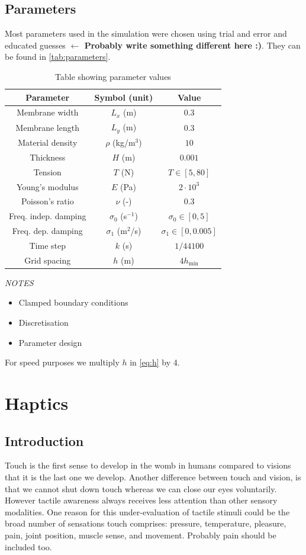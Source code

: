 \documentclass{vgtc}
\begin{document}
\subsection{Parameters}
Most parameters used in the simulation were chosen using trial and error and educated guesses \textbf{$\leftarrow$ Probably write something different here :)}. They can be found in \autoref{tab:parameters}.
\begin{table}[h]
\caption{Table showing parameter values}\label{tab:parameters}
\centering
\begin{tabular}{|c|c|c|}
    \hline
    Parameter & Symbol (unit) & Value \\
    \hline
    Membrane width & $L_x$ (m) & $0.3$\\
    Membrane length & $L_y$ (m) & $0.3$ \\
    Material density & $\rho$ (kg/m$^3$)& $10$ \\
    Thickness & $H$ (m) & $0.001$ \\
    Tension & $T$ (N) & $T \in [5, 80]$ \\
    Young's modulus & $E$ (Pa)& $2\cdot 10^3$ \\
    Poisson's ratio & $\nu$ (-)& $0.3$ \\
    Freq. indep. damping & $\sigma_0$ (s$^{-1}$) & $\sigma_0 \in [0, 5]$\\
    Freq. dep. damping & $\sigma_1$ (m$^2$/s) & $\sigma_1 \in [0, 0.005]$\\
    Time step & $k$ (s) & $1/44100$\\
    Grid spacing & $h$ (m) & $4h_\text{min}$\\
    \hline
\end{tabular}
\end{table}\vspace{1em}

\textit{NOTES}
\begin{itemize}
    \item Clamped boundary conditions
    \item Discretisation
    \item Parameter design
\end{itemize}

For speed purposes we multiply $h$ in \autoref{eq:h} by 4.

\section{Haptics}
\subsection{Introduction}
Touch is the first sense to develop in the womb in humans \cite{Barnett1972} compared to visions that it is the last one we develop. Another difference between touch and vision, is that we cannot shut down touch whereas we can close our eyes voluntarily. However tactile awareness always receives less attention than other sensory modalities. One reason for this under-evaluation of tactile stimuli could be the broad number of sensations touch comprises: pressure, temperature, pleasure, pain, joint position, muscle sense, and movement. Probably pain should be included too. 
\end{document}
